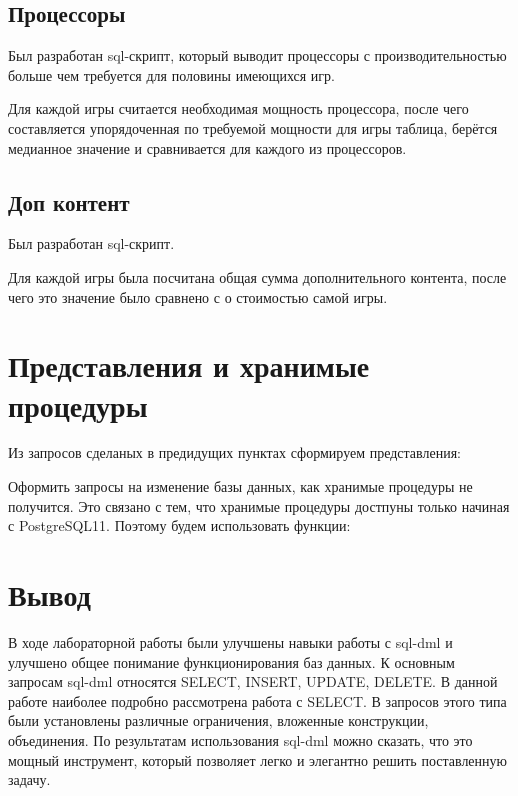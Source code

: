\documentclass[a4paper,14pt]{extarticle}
\begin{document}
\subsection{Процессоры}
Был разработан sql-скрипт, который выводит процессоры с производительностью больше чем требуется для половины имеющихся игр.



Для каждой игры считается необходимая мощность процессора, после чего составляется упорядоченная по требуемой мощности для игры таблица, берётся медианное значение и сравнивается для каждого из процессоров.


\subsection{Доп контент}
Был разработан sql-скрипт.



Для каждой игры была посчитана общая сумма дополнительного контента, после чего это значение было сравнено с о стоимостью самой игры.

\section{Представления и хранимые процедуры}
Из запросов сделаных в предидущих пунктах сформируем представления:



Оформить запросы на изменение базы данных, как хранимые процедуры не получится. Это связано с тем, что хранимые процедуры  достпуны только начиная с PostgreSQL11. Поэтому будем использовать функции:


\section{Вывод}
В ходе лабораторной работы были улучшены навыки работы с sql-dml и улучшено общее понимание функционирования баз данных. К основным запросам sql-dml относятся SELECT, INSERT, UPDATE, DELETE. В данной работе наиболее подробно рассмотрена работа  с SELECT. В запросов этого типа были установлены различные ограничения, вложенные конструкции, объединения. По результатам использования sql-dml можно сказать, что это мощный инструмент, который позволяет легко и элегантно решить поставленную задачу.
\end{document}
